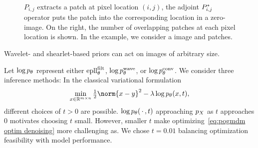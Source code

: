 \begin{figure}
	\caption[Patch extraction operators and overlapping patches]{%
		\( P_{i,j} \) extracts a patch at pixel location \( (i, j) \), the adjoint \( P_{i, j}^{\ast} \) operator puts the patch into the corresponding location in a zero-image.
		On the right, the number of overlapping patches at each pixel location is shown.
		In the example, we consider a  image and  patches.
	}%
	\label{fig:patch extraction}
\end{figure}
Wavelet- and shearlet-based priors can act on images of arbitrary size.

Let \( \log p_\theta \) represent either \( \operatorname{epll}_\theta^{\mathrm{filt}} \), \( \log p^{\mathrm{wave}}_\theta \), or \( \log p^{\mathrm{conv}}_\theta \).
We consider three inference methods:
In the classical variational formulation
\begin{equation}
	\min_{x\in\R^{\Height\times\Width}} \Half \norm{x - y}^{\num{2}} - \lambda \log \GenericModel(x, t),
	\label{eq:pogmdm optim denoising}
\end{equation}
different choices of \( t > \num{0} \) are possible.
\( \log p_\theta(\,\cdot\,, t) \) approaching \( p_X \) as \( t \) approaches \num{0} motivates choosing \( t \) small.
However, smaller \( t \) make optimizing~\cref{eq:pogmdm optim denoising} more challenging as.
We chose \( t = \num{0.01} \) balancing optimization feasibility with model performance.

